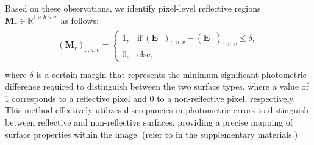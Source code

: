 Based on these observations, we identify pixel-level reflective regions $\mathbf{M}_{r}\in\mathbb{R}^{1 \times h \times w}$ as follows: 
\begin{align}
\begin{split}
    \label{eq:lambertian_assumption}
    (\mathbf{M}_r)_{:, u, v} =
    \begin{cases}
        1, & \mbox{if}~(\mathbf{E}^{-})_{:, u, v} - (\mathbf{E}^{+})_{:, u, v} \leq \delta , \\
        0, & \mbox{else}, 
    \end{cases} \\
\end{split}
\end{align}
where $\delta$ is a certain margin that represents the minimum significant photometric difference required to distinguish between the two surface types, where a value of 1 corresponds to a reflective pixel and 0 to a non-reflective pixel, respectively.
This method effectively utilizes discrepancies in photometric errors to distinguish between reflective and non-reflective surfaces, providing a precise mapping of surface properties within the image. (refer to  in the supplementary materials.)

